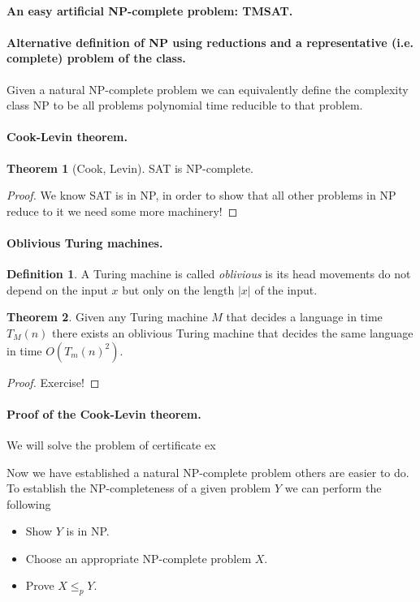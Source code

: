 \documentclass[11pt,a4paper]{article}
\theoremstyle{definition}
\newtheorem{thm}{Theorem}
\newtheorem{defn}{Definition}
\begin{document}
\paragraph{An easy artificial NP-complete problem: TMSAT.}

\paragraph{Alternative definition of NP using reductions and a representative (i.e. complete) problem of the class.}
Given a natural NP-complete problem we can equivalently define the complexity class NP to be all problems polynomial time reducible to that problem.

\paragraph{Cook-Levin theorem.}
\begin{thm}[Cook, Levin]
SAT is NP-complete.
\end{thm}
\begin{proof}
We know SAT is in NP, in order to show that all other problems in NP reduce to it we need some more machinery!
\end{proof}

\paragraph{Oblivious Turing machines.}
\begin{defn}
A Turing machine is called \emph{oblivious} is its head movements do not depend on the input $x$ but only on the length $|x|$ of the input.
\end{defn}

\begin{thm}
Given any Turing machine $M$ that decides a language in time $T_M(n)$ there exists an oblivious Turing machine that decides the same language in time $O(T_m(n)^2)$.
\end{thm}
\begin{proof}
Exercise!
\end{proof}

\paragraph{Proof of the Cook-Levin theorem.}
We will solve the problem of certificate ex %

Now we have established a natural NP-complete problem others are easier to do.
To establish the NP-completeness of a given problem $Y$ we can perform the following
\begin{itemize}
\item[Step 1] Show $Y$ is in NP.
\item[Step 2] Choose an appropriate NP-complete problem $X$.
\item[Step 3] Prove $X\le_p Y$.
\end{itemize}
\end{document}
